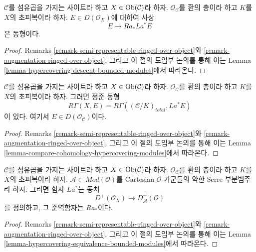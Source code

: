 \begin{lemma}
\label{lemma-hypercovering-X-descent-bounded-modules}
$\mathcal{C}$를 섬유곱을 가지는 사이트라 하고
$X \in \mathop{\mathrm{Ob}}\nolimits(\mathcal{C})$라 하자. $\mathcal{O}_\mathcal{C}$를 환의
층이라 하고 $K$를 $X$의 초피복이라 하자.
$E \in D(\mathcal{O}_X)$에 대하여 사상
$$
E \longrightarrow Ra_*La^*E
$$
은 동형이다.
\end{lemma}

\begin{proof}
Remarks \ref{remark-semi-representable-ringed-over-object}와
\ref{remark-augmentation-ringed-over-object}, 그리고 이 절의 도입부
논의를 통해 이는 Lemma
\ref{lemma-hypercovering-descent-bounded-modules}에서 따라온다.
\end{proof}

\begin{lemma}
\label{lemma-compare-cohomology-hypercovering-X-modules}
$\mathcal{C}$를 섬유곱을 가지는 사이트라 하고
$X \in \mathop{\mathrm{Ob}}\nolimits(\mathcal{C})$라 하자. $\mathcal{O}_\mathcal{C}$를 환의
층이라 하고 $K$를 $X$의 초피복이라 하자. 그러면 정준 동형
$$
R\Gamma(X, E) = R\Gamma((\mathcal{C}/K)_{total}, La^*E)
$$
이 있다. 여기서
$E \in D(\mathcal{O}_\mathcal{C})$이다.
\end{lemma}

\begin{proof}
Remarks \ref{remark-semi-representable-ringed-over-object}와
\ref{remark-augmentation-ringed-over-object}, 그리고 이 절의 도입부
논의를 통해 이는 Lemma
\ref{lemma-compare-cohomology-hypercovering-modules}에서 따라온다.
\end{proof}

\begin{lemma}
\label{lemma-hypercovering-X-equivalence-bounded-modules}
$\mathcal{C}$를 섬유곱을 가지는 사이트라 하고
$X \in \mathop{\mathrm{Ob}}\nolimits(\mathcal{C})$라 하자. $\mathcal{O}_\mathcal{C}$를 환의
층이라 하고 $K$를 $X$의 초피복이라 하자.
$\mathcal{A} \subset \textit{Mod}(\mathcal{O})$를 Cartesian
$\mathcal{O}$-가군들의 약한 Serre 부분범주라 하자. 그러면 함자
$La^*$는 동치
$$
D^+(\mathcal{O}_X) \longrightarrow D_\mathcal{A}^+(\mathcal{O})
$$
를 정의하고, 그 준역함자는 $Ra_*$이다.
\end{lemma}

\begin{proof}
Remarks \ref{remark-semi-representable-ringed-over-object}와
\ref{remark-augmentation-ringed-over-object}, 그리고 이 절의 도입부
논의를 통해 이는 Lemma
\ref{lemma-hypercovering-equivalence-bounded-modules}에서 따라온다.
\end{proof}

